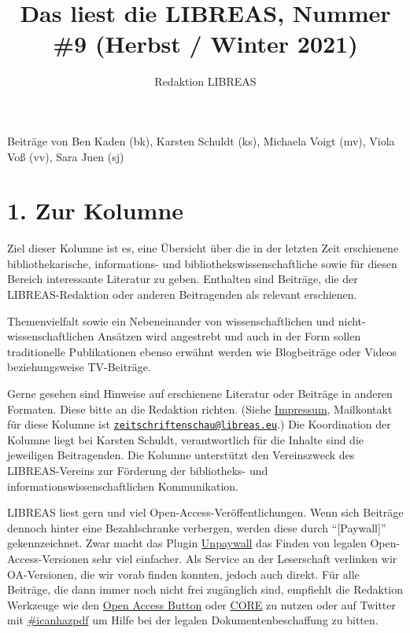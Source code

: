 \documentclass[a4paper,
fontsize=11pt,
oneside,
numbers=noperiodatend,
parskip=half-,
bibliography=totoc,
final
]{scrartcl}
\title{\LARGE{Das liest die LIBREAS, Nummer \#9 (Herbst / Winter 2021)}}%
\author{Redaktion LIBREAS} %
\date{}
\begin{document}
\maketitle
\thispagestyle{fancyplain} 


Beiträge von Ben Kaden (bk), Karsten Schuldt (ks), Michaela Voigt (mv),
Viola Voß (vv), Sara Juen (sj)

\hypertarget{zur-kolumne}{%
\section{1. Zur Kolumne}\label{zur-kolumne}}

Ziel dieser Kolumne ist es, eine Übersicht über die in der letzten Zeit
erschienene bibliothekarische, informations- und
bibliothekswissenschaftliche sowie für diesen Bereich interessante
Literatur zu geben. Enthalten sind Beiträge, die der LIBREAS-Redaktion
oder anderen Beitragenden als relevant erschienen.

Themenvielfalt sowie ein Nebeneinander von wissenschaftlichen und
nicht-wissenschaftlichen Ansätzen wird angestrebt und auch in der Form
sollen traditionelle Publikationen ebenso erwähnt werden wie
Blogbeiträge oder Videos beziehungsweise TV-Beiträge.

Gerne gesehen sind Hinweise auf erschienene Literatur oder Beiträge in
anderen Formaten. Diese bitte an die Redaktion richten. (Siehe
\href{http://libreas.eu/about/}{Impressum}, Mailkontakt für diese
Kolumne ist
\href{mailto:zeitschriftenschau@libreas.eu}{\nolinkurl{zeitschriftenschau@libreas.eu}}.)
Die Koordination der Kolumne liegt bei Karsten Schuldt, verantwortlich
für die Inhalte sind die jeweiligen Beitragenden. Die Kolumne
unterstützt den Vereinszweck des LIBREAS-Vereins zur Förderung der
bibliotheks- und informationswissenschaftlichen Kommunikation.

LIBREAS liest gern und viel Open-Access-Veröffentlichungen. Wenn sich
Beiträge dennoch hinter eine Bezahlschranke verbergen, werden diese
durch \enquote{{[}Paywall{]}} gekennzeichnet. Zwar macht das Plugin
\href{http://unpaywall.org/}{Unpaywall} das Finden von legalen
Open-Access-Versionen sehr viel einfacher. Als Service an der
Leserschaft verlinken wir OA-Versionen, die wir vorab finden konnten,
jedoch auch direkt. Für alle Beiträge, die dann immer noch nicht frei
zugänglich sind, empfiehlt die Redaktion Werkzeuge wie den
\href{https://openaccessbutton.org/}{Open Access Button} oder
\href{https://core.ac.uk/services/discovery/}{CORE} zu nutzen oder auf
Twitter mit
\href{https://twitter.com/hashtag/icanhazpdf?src=hash}{\#icanhazpdf} um
Hilfe bei der legalen Dokumentenbeschaffung zu bitten.
\end{document}
